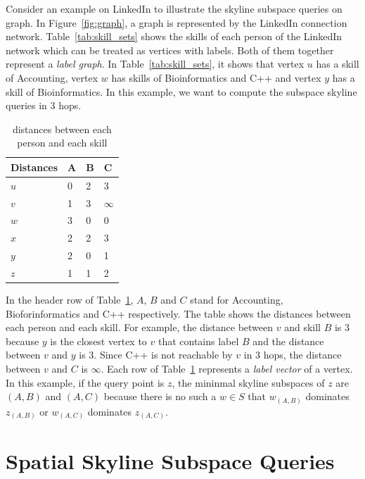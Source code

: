 Consider an example on LinkedIn to illustrate the skyline subspace queries on graph. In Figure~\ref{fig:graph}, a graph is represented by the LinkedIn connection network. Table~\ref{tab:skill_sets} shows the skills of each person of the LinkedIn network which can be treated as vertices with labels. 
Both of them together represent a \emph{label graph}. In Table~\ref{tab:skill_sets}, it shows that vertex $u$ has a skill of Accounting, vertex $w$ has skills of Bioinformatics and C++ and vertex $y$ has a skill of Bioinformatics. In this example, we want to compute the subspace skyline queries in $3$ hops.

\begin{table}[h]
    \centering
    \begin{tabular}{llll}
    \hline
        Distances & A & B & C \\ \hline
        $u$       & 0 & 2 & 3 \\ \hline
        $v$       & 1 & 3 & $\infty$ \\ \hline
        $w$       & 3 & 0 & 0 \\ \hline
        $x$       & 2 & 2 & 3 \\ \hline
        $y$       & 2 & 0 & 1 \\ \hline
        $z$       & 1 & 1 & 2 \\ \hline
    \end{tabular}
    \caption{\label{tab:distances_graph} distances between each person and each skill}
    
\end{table}

In the header row of Table~\ref{tab:distances_graph}, $A$, $B$ and $C$ stand for Accounting, Bioforinformatics and C++ respectively. The table shows the distances between each person and each skill. For example, the distance between $v$ and skill $B$ is $3$ because $y$ is the closest vertex to $v$ that contains label $B$ and the distance between $v$ and $y$ is $3$. Since C++ is not reachable by $v$ in $3$ hops, the distance between $v$ and $C$ is $\infty$. Each row of Table~\ref{tab:distances_graph} represents a \emph{label vector} of a vertex.
In this example, if the query point is $z$, the mininmal skyline subspaces of $z$ are $(A, B)$ and $(A, C)$ because there is no such a $w \in S$ that $w_{(A,B)}$ dominates $z_{(A,B)}$ or $w_{(A,C)}$ dominates $z_{(A,C)}$.


\section{Spatial Skyline Subspace Queries}

